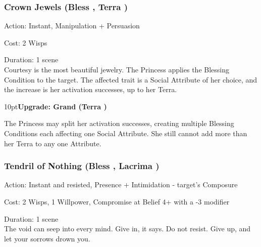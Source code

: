 \subsubsection*{Crown Jewels (Bless \textbullet\textbullet\textbullet\textbullet, Terra \textbullet\textbullet)}

\noindent Action: Instant, Manipulation + Persuasion

\noindent Cost: 2 Wisps

\noindent Duration: 1 scene \\

\noindent Courtesy is the most beautiful jewelry. The Princess applies the Blessing Condition to the target. The affected trait is a Social Attribute of her choice, and the increase is her activation successes, up to her Terra.

\begin{myindentpar}{10pt}\textbf{Upgrade: Grand (Terra \textbullet\textbullet\textbullet)}

The Princess may split her activation successes, creating multiple Blessing Conditions each affecting one Social Attribute. She still cannot add more than her Terra to any one Attribute.\end{myindentpar}

\subsubsection*{Tendril of Nothing (Bless \textbullet\textbullet\textbullet\textbullet, Lacrima \textbullet\textbullet\textbullet)}

\noindent Action: Instant and resisted, Presence + Intimidation - target's Composure

\noindent Cost: 2 Wisps, 1 Willpower, Compromise at Belief 4+ with a -3 modifier

\noindent Duration: 1 scene \\

\noindent The void can seep into every mind. Give in, it says. Do not resist. Give up, and let your sorrows drown you.


